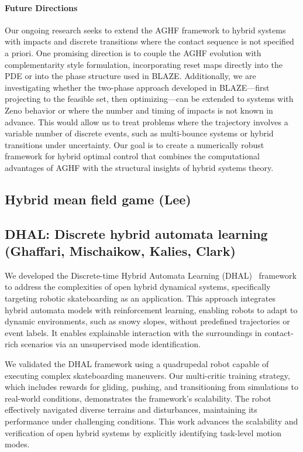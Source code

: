 \documentclass[letterpaper,11pt]{article}
\begin{document}
\paragraph*{Future Directions} Our ongoing research seeks to extend the AGHF framework to hybrid systems with impacts and discrete transitions where the contact sequence is not specified a priori.
 One promising direction is to couple the AGHF evolution with complementarity style formulation, incorporating reset maps directly into the PDE or into the phase structure used in BLAZE.
Additionally, we are investigating whether the two-phase approach developed in BLAZE—first projecting to the feasible set, then optimizing—can be extended to systems with Zeno behavior or where the number and timing of impacts is not known in advance. 
This would allow us to treat problems where the trajectory involves a variable number of discrete events, such as multi-bounce systems or hybrid transitions under uncertainty. 
Our goal is to create a numerically robust framework for hybrid optimal control that combines the computational advantages of AGHF with the structural insights of hybrid systems theory.

\subsection{Hybrid mean field game (Lee)}
\subsection{DHAL: Discrete hybrid automata learning (Ghaffari, Mischaikow, Kalies, Clark)}

We developed the Discrete-time Hybrid Automata Learning (DHAL)~\cite{liu2025discrete} framework to address the complexities of open hybrid dynamical systems, specifically targeting robotic skateboarding as an application. This approach integrates hybrid automata models with reinforcement learning, enabling robots to adapt to dynamic environments, such as snowy slopes, without predefined trajectories or event labels. It enables explainable interaction with the surroundings in contact-rich scenarios via an unsupervised mode identification.

We validated the DHAL framework using a quadrupedal robot capable of executing complex skateboarding maneuvers. Our multi-critic training strategy, which includes rewards for gliding, pushing, and transitioning from simulations to real-world conditions, demonstrates the framework's scalability. The robot effectively navigated diverse terrains and disturbances, maintaining its performance under challenging conditions. This work advances the scalability and verification of open hybrid systems by explicitly identifying task-level motion modes.
\end{document}
